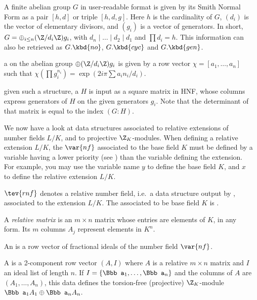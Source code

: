 
A finite abelian group $G$ in user-readable format is given by its Smith
Normal Form as a pair $[h,d]$ or triple $[h,d,g]$.
Here $h$ is the cardinality of $G$, $(d_i)$ is the vector of elementary
divisors, and $(g_i)$ is a vector of generators. In short,
$G = \oplus_{i\leq n} (\Z/d_i\Z) g_i$, with $d_n \mid \dots \mid d_2 \mid d_1$
and $\prod d_i = h$. This information can also be retrieved as
$G.\kbd{no}$, $G.\kbd{cyc}$ and $G.\kbd{gen}$.

\item a  on the abelian group
$\oplus (\Z/d_i\Z) g_i$
is given by a row vector $\chi = [a_1,\ldots,a_n]$ such that
$\chi(\prod g_i^{n_i}) = \exp(2i\pi\sum a_i n_i / d_i)$.

\item given such a structure, a  $H$ is input as a square
matrix in HNF, whose columns express generators of $H$ on the given generators
$g_i$. Note that the determinant of that matrix is equal to the index $(G:H)$.


We now have a look at data structures associated to relative extensions
of number fields $L/K$, and to projective $\Z_K$-modules. When defining a
relative extension $L/K$, the $\var{nf}$ associated to the base field $K$
must be defined by a variable having a lower priority (see
) than the variable defining the extension. For example,
you may use the variable name $y$ to define the base field $K$, and $x$ to
define the relative extension $L/K$.

\label{se:ZKmodules}

\item $\tev{rnf}$ denotes a relative number field, i.e.~a data structure
output by , associated to the extension $L/K$. The 
associated to be base field $K$ is .

\item A \emph{relative matrix} is an $m\times n$ matrix whose entries are
elements of $K$, in any form. Its $m$ columns $A_j$ represent elements
in $K^n$.

\item An  is a row vector of fractional ideals of the number
field $\var{nf}$.

\item A  is a 2-component row vector $(A,I)$ where $A$
is a relative $m\times n$ matrix and $I$ an ideal list of length $n$. If $I =
\{{\Bbb a}_1,\dots, {\Bbb a}_n\}$ and the columns of $A$ are $(A_1,\dots,
A_n)$, this data defines the torsion-free (projective) $\Z_K$-module ${\Bbb
a}_1 A_1\oplus {\Bbb a}_n A_n$.

